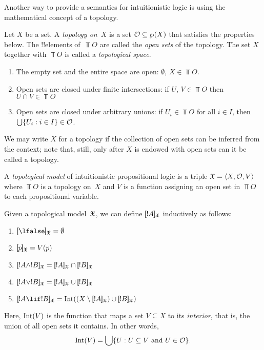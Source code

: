 \documentclass[../../../include/open-logic-section]{subfiles}
\begin{document}


Another way to provide a semantics for intuitionistic logic is using
the mathematical concept of a topology.

\begin{defn}
  Let $X$ be a set. A \emph{topology on~$X$} is a set $\mathcal{O}
  \subseteq \wp(X)$ that satisfies the properties below. The
  !!{element}s of~$\Top{O}$ are called the \emph{open sets} of the
  topology. The set $X$ together with $\Top{O}$ is called a
  \emph{topological space}.
  \begin{enumerate}
  \item The empty set and the entire space are open: $\emptyset$, $X \in
    \Top{O}$.
  \item Open sets are closed under finite intersections: if $U$, $V \in
    \Top{O}$ then $U \cap V \in \Top{O}$
  \item Open sets are closed under arbitrary unions: if $U_i \in
    \Top{O}$ for all $i \in I$, then $\bigcup \{ U_i : i \in
      I \} \in \mathcal{O}$.
  \end{enumerate}
\end{defn}

We may write $X$ for a topology if the collection of open sets can be
inferred from the context; note that, still, only after $X$ is endowed
with open sets can it be called a topology.

\begin{defn}
  A \emph{topological model} of intuitionistic propositional logic is
  a triple $\mModel{X} = \tuple{X, \Top{O}, V}$ where $\Top{O}$ is a
  topology on~$X$ and $V$ is a function assigning an open set in
  $\Top{O}$ to each propositional variable.

  Given a topological model~$\mModel{X}$, we can define $\Prop{X}{!A}$
  inductively as follows:
  \begin{enumerate}
  \item $\Prop{X}{\lfalse} = \emptyset$
  \item $\Prop{X}{p} = V(p)$
  \item $\Prop{X}{!A \land !B} = \Prop{X}{!A} \cap \Prop{X}{!B}$
  \item $\Prop{X}{!A \lor !B} = \Prop{X}{!A} \cup \Prop{X}{!B}$
  \item $\Prop{X}{!A \lif !B} = \Interior{(X \setminus \Prop{X}{!A}) \cup
    \Prop{X}{!B}}$
  \end{enumerate}
  Here, $\mathrm{Int}(V)$ is the function that maps a set $V \subseteq X$
  to its \emph{interior}, that is, the union of all open sets it
  contains. In other words,
  \[
  \mathrm{Int}(V) = \bigcup \{ U : U \subseteq V \text{ and } U \in \mathcal{O} \}.
  \]
\end{defn}
\end{document}
